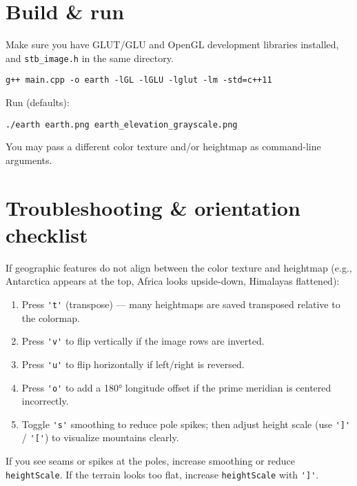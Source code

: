 \documentclass[11pt]{article}
\begin{document}
\section{Build \& run}
Make sure you have GLUT/GLU and OpenGL development libraries installed, and \verb|stb_image.h| in the same directory.

\begin{verbatim}
g++ main.cpp -o earth -lGL -lGLU -lglut -lm -std=c++11
\end{verbatim}

Run (defaults):

\begin{verbatim}
./earth earth.png earth_elevation_grayscale.png
\end{verbatim}

You may pass a different color texture and/or heightmap as command-line arguments.

\section{Troubleshooting \& orientation checklist}
If geographic features do not align between the color texture and heightmap (e.g., Antarctica appears at the top, Africa looks upside-down, Himalayas flattened):
\begin{enumerate}
  \item Press \verb|'t'| (transpose) — many heightmaps are saved transposed relative to the colormap.
  \item Press \verb|'v'| to flip vertically if the image rows are inverted.
  \item Press \verb|'u'| to flip horizontally if left/right is reversed.
  \item Press \verb|'o'| to add a 180° longitude offset if the prime meridian is centered incorrectly.
  \item Toggle \verb|'s'| smoothing to reduce pole spikes; then adjust height scale (use \verb|']'| / \verb|'['|) to visualize mountains clearly.
\end{enumerate}

If you see seams or spikes at the poles, increase smoothing or reduce \texttt{heightScale}. If the terrain looks too flat, increase \texttt{heightScale} with \verb|']'|.
\end{document}
